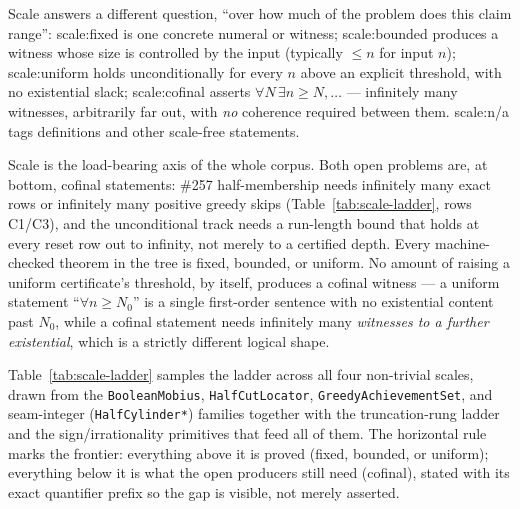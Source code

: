\documentclass[11pt]{article}
\theoremstyle{plain}
\theoremstyle{definition}
\theoremstyle{remark}
\newcommand{\scale}[1]{{\small\textsf{scale:#1}}\xspace}
\begin{document}
Scale answers a different question, ``over how much of the problem does this
claim range'': \scale{fixed} is one concrete numeral or witness; \scale{bounded} produces a
witness whose size is controlled by the input (typically $\le n$ for input $n$); \scale{uniform}
holds unconditionally for every $n$ above an explicit threshold, with no existential slack;
\scale{cofinal} asserts $\forall N\,\exists n\ge N,\ldots$ — infinitely many witnesses, arbitrarily
far out, with \emph{no} coherence required between them. \scale{n/a} tags definitions and other
scale-free statements.

Scale is the load-bearing axis of the whole corpus. Both open problems are, at bottom, cofinal
statements: \#257 half-membership needs infinitely many exact rows or infinitely many positive
greedy skips (Table~\ref{tab:scale-ladder}, rows C1/C3), and the unconditional track needs a
run-length bound that holds at every reset row out to infinity, not merely to a certified depth.
Every machine-checked theorem in the tree is fixed, bounded, or uniform. No amount of raising a
uniform certificate's threshold, by itself, produces a cofinal witness — a uniform statement
``$\forall n\ge N_0$'' is a single first-order sentence with no existential content past $N_0$,
while a cofinal statement needs infinitely many \emph{witnesses to a further existential}, which is
a strictly different logical shape.

Table~\ref{tab:scale-ladder} samples the ladder across all four non-trivial scales, drawn from the
\texttt{BooleanMobius}, \texttt{HalfCutLocator}, \texttt{GreedyAchievementSet}, and seam-integer
(\texttt{HalfCylinder*}) families together with the truncation-rung ladder and the sign/irrationality
primitives that feed all of them. The horizontal rule marks the frontier: everything above it is
proved (fixed, bounded, or uniform); everything below it is what the open producers still need
(cofinal), stated with its exact quantifier prefix so the gap is visible, not merely asserted.
\end{document}
